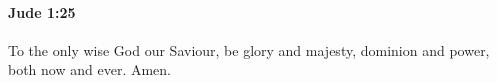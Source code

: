 		\paragraph{Jude 1:25} %
			\label{JUDE-1-25}

			To the only wise God our Saviour, be glory and majesty, dominion and power, both now and ever. Amen.

			\begin{framed}
			\scriptsize
				\begin{compactdesc}
					\item[SBLG] 
				\end{compactdesc}
			\end{framed}